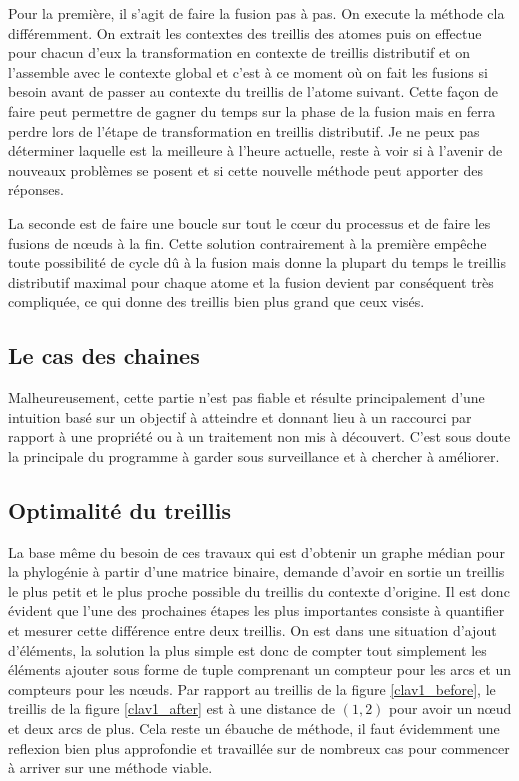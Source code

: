 \smallbreak

Pour la première, il s'agit de faire la fusion pas à pas. On execute la méthode cla différemment. On extrait les contextes des treillis des atomes puis on effectue pour chacun d'eux la transformation en contexte de treillis distributif et on l'assemble avec le contexte global et c'est à ce moment où on fait les fusions si besoin avant de passer au contexte du treillis de l'atome suivant. Cette façon de faire peut permettre de gagner du temps sur la phase de la fusion mais en ferra perdre lors de l'étape de transformation en treillis distributif. Je ne peux pas déterminer laquelle est la meilleure à l'heure actuelle, reste à voir si à l'avenir de nouveaux problèmes se posent et si cette nouvelle méthode peut apporter des réponses.

\smallbreak

La seconde est de faire une boucle sur tout le c\oe ur du processus et de faire les fusions de n\oe uds à la fin. Cette solution contrairement à la première empêche toute possibilité de cycle dû à la fusion mais donne la plupart du temps le treillis distributif maximal pour chaque atome et la fusion devient par conséquent très compliquée, ce qui donne des treillis bien plus grand que ceux visés.

\subsection{Le cas des chaines}

Malheureusement, cette partie n'est pas fiable et résulte principalement d'une intuition basé sur un objectif à atteindre et donnant lieu à un raccourci par rapport à une propriété ou à un traitement non mis à découvert. C'est sous doute la principale du programme à garder sous surveillance et à chercher à améliorer.

\subsection{Optimalité du treillis}

La base même du besoin de ces travaux qui est d'obtenir un graphe médian pour la phylogénie à partir d'une matrice binaire, demande d'avoir en sortie un treillis le plus petit et le plus proche possible du treillis du contexte d'origine. Il est donc évident que l'une des prochaines étapes les plus importantes consiste à quantifier et mesurer cette différence entre deux treillis. On est dans une situation d'ajout d'éléments, la solution la plus simple est donc de compter tout simplement les éléments ajouter sous forme de tuple comprenant un compteur pour les arcs et un compteurs pour les n\oe uds. Par rapport au treillis de la figure \ref{clav1_before}, le treillis de la figure \ref{clav1_after} est à une distance de $(1, 2)$ pour avoir un n\oe ud et deux arcs de plus. Cela reste un ébauche de méthode, il faut évidemment une reflexion bien plus approfondie et travaillée sur de nombreux cas pour commencer à arriver sur une méthode viable.

